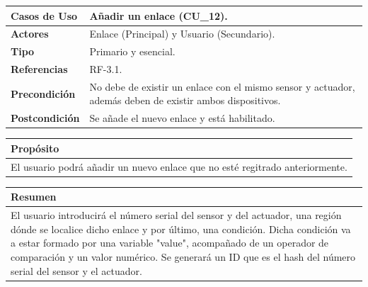\begin{itemize}
    \begin{table}[h!]
        \centering
        \begin{tabular}{|l|p{}|}
            \hline
            \textbf{Casos de Uso}   &   Añadir un enlace (CU\_12). \\
            \hline 
            \textbf{Actores}        &   Enlace (Principal) y Usuario (Secundario). \\ 
            \hline 
            \textbf{Tipo}           &   Primario y esencial. \\ 
            \hline
            \textbf{Referencias}    &   RF-3.1. \\ 
            \hline
            \textbf{Precondición}   &   No debe de existir un enlace con el mismo sensor y actuador, además deben
            de existir ambos dispositivos. \\ 
            \hline
            \textbf{Postcondición}  &   Se añade el nuevo enlace y está habilitado. \\ 
            \hline
        \end{tabular}
        
        \vspace{5mm}
        
        \begin{tabular}{|p{\textwidth}|}
            \hline
            \rowcolor{SeaGreen} \textbf{Propósito} \\
            \hline
            \multicolumn{1}{|p{12cm}|}{El usuario podrá añadir un nuevo enlace que no esté regitrado anteriormente.} \\ [0.5ex]
            \hline
        \end{tabular}
        
        \vspace{5mm}
        
        \begin{tabular}{|p{\textwidth}|}
            \hline
            \rowcolor{SeaGreen} \textbf{Resumen} \\
            \hline
            \multicolumn{1}{|p{12cm}|}{El usuario introducirá el número serial del sensor y del actuador, una región dónde se localice 
            dicho enlace y por último, una condición. Dicha condición va a estar formado por una variable "value", acompañado de un 
            operador de comparación y un valor numérico. Se generará un ID que es el hash del número serial del sensor y el actuador.} \\ [0.5ex]
            \hline
        \end{tabular}
        

\end{table}
\end{itemize}

